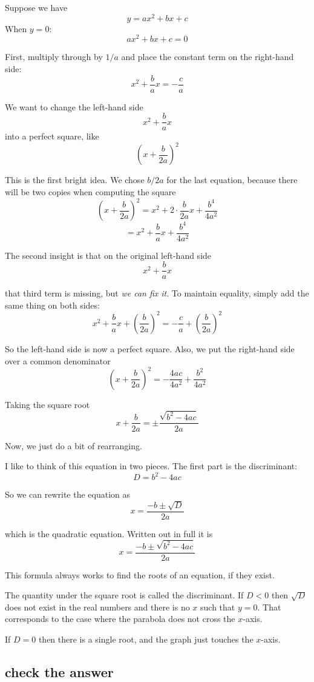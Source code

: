 \documentclass[11pt, oneside]{article}
\begin{document}
Suppose we have
\[ y = ax^2 + bx + c \]
When $y = 0$:
\[ ax^2 + bx + c = 0 \]

First, multiply through by $1/a$ and place the constant term on the right-hand side:
\[ x^2 + \frac{b}{a} x = - \frac{c}{a} \]

We want to change the left-hand side
\[ x^2 + \frac{b}{a} x \]
into a perfect square, like
\[ (x + \frac{b}{2a})^2 \]

This is the first bright idea.  We chose $b/2a$ for the last equation, because there will be two copies when computing the square
\[ (x + \frac{b}{2a})^2 = x^2 + 2 \cdot  \frac{b}{2a} x +  \frac{b^4}{4a^2} \]
\[ = x^2 + \frac{b}{a} x +  \frac{b^4}{4a^2} \]

The second insight is that on the original left-hand side
\[ x^2 + \frac{b}{a} x \]

that third term is missing, but \emph{we can fix it}.  To maintain equality, simply add the same thing on both sides:
\[ x^2 + \frac{b}{a} x + (\frac{b}{2a})^2  = -\frac{c}{a} + (\frac{b}{2a})^2 \]

So the left-hand side is now a perfect square.  Also, we put the right-hand side over a common denominator
\[ (x + \frac{b}{2a})^2 = -\frac{4ac}{4a^2} + \frac{b^2}{4a^2} \]

Taking the square root
\[ x + \frac{b}{2a} = \pm \frac{\sqrt{b^2 - 4ac}}{2a} \]

Now, we just do a bit of rearranging.  

I like to think of this equation in two pieces.  The first part is the discriminant:  
\[ D = b^2 - 4ac \]

So we can rewrite the equation as
\[ x = \frac{-b \pm \sqrt{D}}{2a}  \]

which is the quadratic equation.  Written out in full it is
\[ x =  \frac{-b \pm \sqrt{b^2 - 4ac}}{2a}  \]

This formula always works to find the roots of an equation, if they exist.  

The quantity under the square root is called the discriminant.
If $D < 0$ then $\sqrt{D}$ does not exist in the real numbers and there is no $x$ such that $y = 0$.  That corresponds to the case where the parabola does not cross the $x$-axis.

If $D = 0$ then there is a single root, and the graph just touches the $x$-axis.

\subsection*{check the answer}
\end{document}

